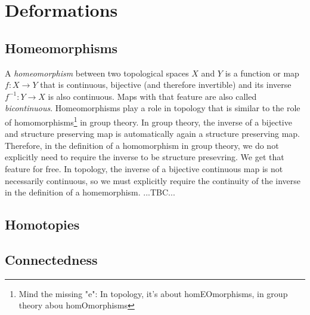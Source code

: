 \section{Deformations}


\subsection{Homeomorphisms}
A \emph{homeomorphism} between two topological spaces $X$ and $Y$ is a function or map $f: X \rightarrow Y$ that is continuous, bijective (and therefore invertible) and its inverse $f^{-1}: Y \rightarrow X$ is also continuous. Maps with that feature are also called \emph{bicontinuous}. Homeomorphisms play a role in topology that is similar to the role of homomorphisms\footnote{Mind the missing "e": In topology, it's about homEOmorphisms, in group theory abou homOmorphisms} in group theory. In group theory, the inverse of a bijective and structure preserving map is automatically again a structure preserving map. Therefore, in the definition of a homomorphism in group theory, we do not explicitly need to require the inverse to be structure presevring. We get that feature for free. In topology, the inverse of a bijective continuous map is not necessarily continuous, so we must explicitly require the continuity of the inverse in the definition of a homemorphism. ...TBC...




\subsection{Homotopies}



\subsection{Connectedness}

